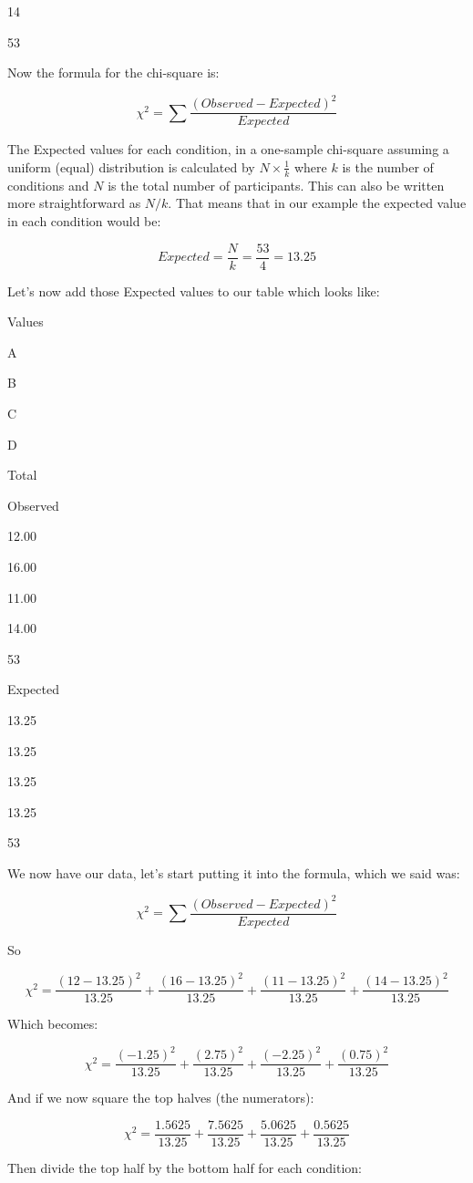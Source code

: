 \documentclass[
  oneside]{book}
\begin{document}
14

53

Now the formula for the chi-square is:

\[\chi^2 = \sum\frac{(Observed - Expected)^2}{Expected}\]

The Expected values for each condition, in a one-sample chi-square assuming a uniform (equal) distribution is calculated by \(N \times \frac{1}{k}\) where \(k\) is the number of conditions and \(N\) is the total number of participants. This can also be written more straightforward as \(N/k\). That means that in our example the expected value in each condition would be:

\[Expected = \frac{N}{k} = \frac{53}{4} = 13.25\]

Let's now add those Expected values to our table which looks like:

Values

A

B

C

D

Total

Observed

12.00

16.00

11.00

14.00

53

Expected

13.25

13.25

13.25

13.25

53

We now have our data, let's start putting it into the formula, which we said was:

\[\chi^2 = \sum\frac{(Observed - Expected)^2}{Expected}\]

So

\[\chi^2 = \frac{(12 - 13.25)^2}{13.25}+\frac{(16 - 13.25)^2}{13.25}+\frac{(11 - 13.25)^2}{13.25}+\frac{(14 - 13.25)^2}{13.25}\]

Which becomes:

\[\chi^2 = \frac{(-1.25)^2}{13.25} + \frac{(2.75)^2}{13.25} + \frac{(-2.25)^2}{13.25} + \frac{(0.75)^2}{13.25}\]

And if we now square the top halves (the numerators):

\[\chi^2 = \frac{1.5625}{13.25} + \frac{7.5625}{13.25} + \frac{5.0625}{13.25} + \frac{0.5625}{13.25}\]

Then divide the top half by the bottom half for each condition:
\end{document}
